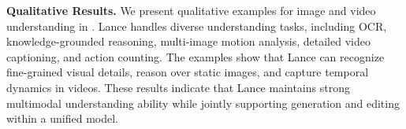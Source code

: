 \textbf{Qualitative Results.}
We present qualitative examples for image and video understanding in .
Lance handles diverse understanding tasks, including OCR, knowledge-grounded reasoning, multi-image motion analysis, detailed video captioning, and action counting. The examples show that Lance can recognize fine-grained visual details, reason over static images, and capture temporal dynamics in videos. These results indicate that Lance maintains strong multimodal understanding ability while jointly supporting generation and editing within a unified model.


